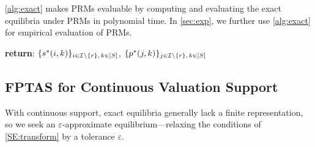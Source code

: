 \vspace{1em}

\cref{alg:exact} makes PRMs evaluable by computing and evaluating the exact equilibria under PRMs in polynomial time.
In \cref{sec:exp}, we further use \cref{alg:exact} for empirical evaluation of PRMs.



\begin{algorithm}[t]
\caption{Exact Perfect Bayesian Equilibrium on Trees}
\label{alg:exact}
\textbf{return}: $\{s^*(i,k)\}_{i \in \mathcal{I} \setminus \{r\},\, k \in [S]}$, $\{p^*(j,k)\}_{j \in \mathcal{I} \setminus \{r\},\, k \in [S]}$
\end{algorithm}

\subsection{FPTAS for Continuous Valuation Support}
\label{subsec:approx-continuous}

With continuous support, exact equilibria generally lack a finite representation, so we seek an $\varepsilon$-approximate equilibrium---relaxing the conditions of \cref{SE:transform} by a tolerance $\varepsilon$.

